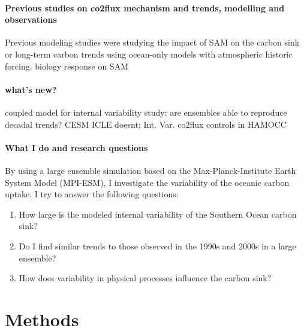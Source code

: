 \documentclass[12pt]{article}
\begin{document}
 

\paragraph{Previous studies on co2flux mechanism and trends, modelling and observations}
Previous modeling studies were studying the impact of SAM on the carbon sink \citep{Lovenduski2007,Hauck2013} or long-term carbon trends \citep{wang2012} using ocean-only models with atmospheric historic forcing. biology response on SAM \citep{Lovenduski2005}

\paragraph{what's new?}
coupled model for internal variability study: are ensembles able to reproduce decadal trends? CESM ICLE doesnt; Int. Var. co2flux controls in HAMOCC


\paragraph{What I do and research questions}
By using a large ensemble simulation based on the Max-Planck-Institute Earth System Model (MPI-ESM), I investigate the variability of the oceanic carbon uptake. I try to answer the following questions: 
\begin{enumerate}
\item How large is the modeled internal variability of the Southern Ocean carbon sink? 
\item Do I find similar trends to those observed in the 1990s and 2000s in a large ensemble? 
\item How does variability in physical processes influence the carbon sink?

\end{enumerate}

\clearpage

\section{Methods}
\end{document}
